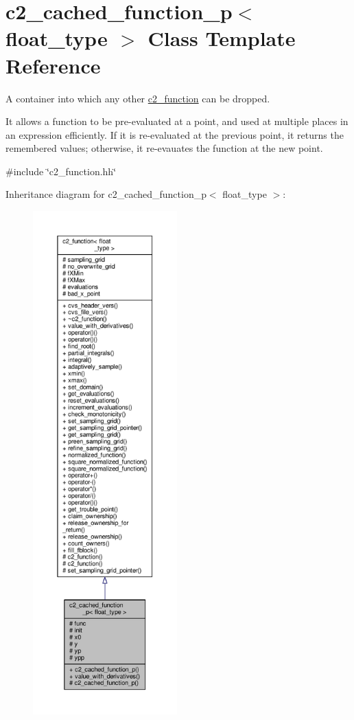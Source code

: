 \hypertarget{classc2__cached__function__p}{}\section{c2\+\_\+cached\+\_\+function\+\_\+p$<$ float\+\_\+type $>$ Class Template Reference}
\label{classc2__cached__function__p}


A container into which any other \hyperlink{classc2__function}{c2\+\_\+function} can be dropped.

It allows a function to be pre-\/evaluated at a point, and used at multiple places in an expression efficiently. If it is re-\/evaluated at the previous point, it returns the remembered values; otherwise, it re-\/evauates the function at the new point.  




{\ttfamily \#include \char`\"{}c2\+\_\+function.\+hh\char`\"{}}



Inheritance diagram for c2\+\_\+cached\+\_\+function\+\_\+p$<$ float\+\_\+type $>$\+:
\nopagebreak
\begin{figure}[H]
\begin{center}
\leavevmode
\includegraphics[height=550pt]{classc2__cached__function__p__inherit__graph}
\end{center}
\end{figure}


